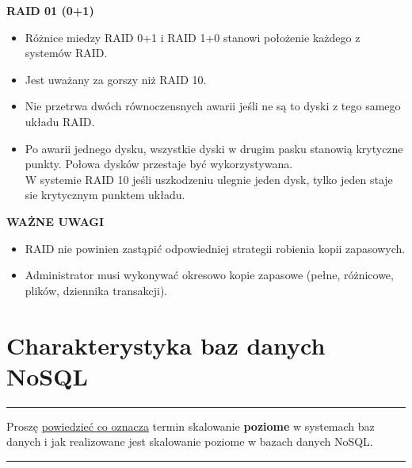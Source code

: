 \documentclass[a5paper,6pt]{article}
\newcommand{\horrule}[1]{\rule{\linewidth}{#1}}
\begin{document}
    \textbf{RAID 01 (0+1)}
    \begin{itemize}
        \item Różnice miedzy RAID 0+1 i RAID 1+0 stanowi położenie każdego z
              systemów RAID.
        \item Jest uważany za gorszy niż RAID 10.
        \item Nie przetrwa dwóch równoczensnych awarii jeśli ne są to dyski
              z tego samego układu RAID.
        \item Po awarii jednego dysku, wszystkie dyski w drugim pasku stanowią
              krytyczne punkty. Połowa dysków przestaje być wykorzystywana.\\
              W systemie RAID 10 jeśli uszkodzeniu ulegnie jeden dysk, tylko
              jeden staje sie krytycznym punktem układu.
    \end{itemize}

    \begin{center}
    \end{center}

    \textbf{WAŻNE UWAGI}
    \begin{itemize}
        \item RAID nie powinien zastąpić odpowiedniej strategii robienia kopii
              zapasowych.
        \item Administrator musi wykonywać okresowo kopie zapasowe (pełne,
              różnicowe, plików, dziennika transakcji).
    \end{itemize}


    \section{Charakterystyka baz danych NoSQL} %
    \label{sec:charakterystyka_baz_danych_nosql}

    \horrule{0.5pt}
    Proszę \underline{powiedzieć co oznacza} termin skalowanie \textbf{poziome}
    w systemach baz danych i jak realizowane jest skalowanie poziome w bazach
    danych NoSQL.\\
    \horrule{0.5pt}
\end{document}
